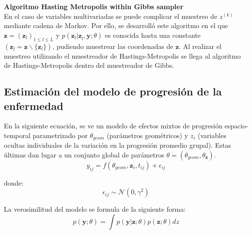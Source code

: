 \begin{description}
		\item {\textbf{Algoritmo Hasting Metropolis within Gibbs sampler }}\\
		En el caso de variables multivariadas se puede complicar el muestreo de $z^{(k)}$ mediante cadena de Markov. Por ello, se desarrolló este algoritmo en el que $\mathbf{z}=(\mathbf{z}_{l})_{1\leq l\leq L}$ y $p(\mathbf{z}_{l}|\mathbf{z}_{\bar{l}}, \mathbf{y};\theta)$ es conocida hasta una constante $(\mathbf{z}_{\bar{l}}=\mathbf{z} \backslash \{{\mathbf{z}_{l}}\})$, pudiendo muestrear las coordenadas de $\mathbf{z}$. Al realizar el muestreo utilizando el muestreador de Hastings-Metropolis se llega al algoritmo de Hastings-Metropolis dentro del muestreador de Gibbs.
	\end{description}
	
	\subsection{Estimación del modelo de progresión de la enfermedad}
	En la siguiente ecuación, se ve un modelo de efectos mixtos de progresión espacio-temporal parametrizado por $\theta_{geom}$ (parámetros geométricos) y $z_{i}$ (variables ocultas individuales de la variación en la progresión promedio grupal). Estas últimas dan lugar a un conjunto global de parámetros $\theta=(\theta_{geom}, \theta_{\mathbf{z}})$.
	\begin{equation}
		y_{ij}=f(\theta_{geom},\mathbf{z}_{i},t_{ij})+\epsilon_{ij}
	\end{equation}
	
	donde:
	\begin{equation}
		\epsilon_{ij} \sim \mathcal{N}(0, \gamma^{2})
	\end{equation}
	
	La verosimilitud del modelo se formula de la siguiente forma:
	\begin{equation}
		p(\mathbf{y};\theta) = \int p(\mathbf{y}|\mathbf{z};\theta)p(\mathbf{z};\theta)dz
	\end{equation}
	
